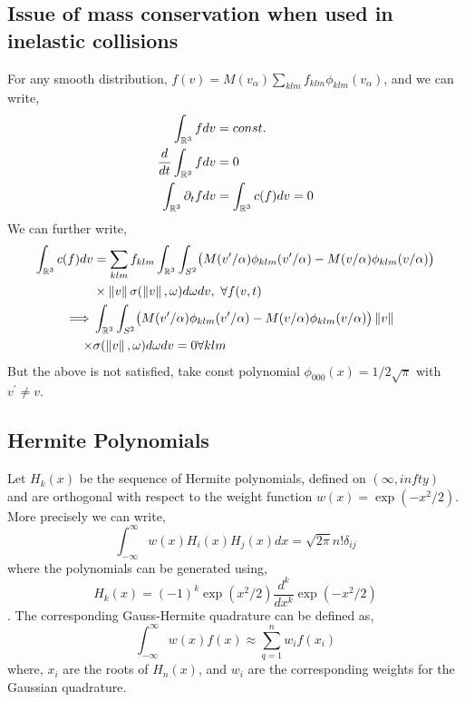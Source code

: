 \documentclass{article}
\begin{document}
\subsection{Issue of mass conservation when used in inelastic collisions}
For any smooth distribution, $f(v) = M(v_\alpha) \sum_{klm} f_{klm} \phi_{klm}(v_\alpha)$, and we can write, 
\begin{align}
\int_{\mathbb{R}^3} f dv &= const.  \\
\frac{d}{dt} \int_{\mathbb{R}^3} f dv &= 0  \\
\int_{\mathbb{R}^3} \partial_t f  dv &= \int_{\mathbb{R}^3} c(f) dv =0 \\
\end{align}
We can further write, 
\begin{align}
\int_{\mathbb{R}^3} c(f) dv  &= \sum_{klm} f_{klm} \int_{\mathbb{R}^3}\int_{S^2} \bigl( M(v^\prime/\alpha) \phi_{klm}(v^\prime/\alpha) -   M(v/\alpha) \phi_{klm}(v/\alpha) \bigr) \\ &\times\left\lVert v\right\rVert \sigma(\left\lVert v\right\rVert,\omega) d\omega dv, \  \forall f(v,t) \\
\implies & \int_{\mathbb{R}^3}\int_{S^2} \bigl( M(v^\prime/\alpha) \phi_{klm}(v^\prime/\alpha) -   M(v/\alpha) \phi_{klm}(v/\alpha) \bigr) \left\lVert v\right\rVert \\ \times &\sigma(\left\lVert v\right\rVert,\omega) d\omega dv =0  \forall klm
\end{align}
But the above is not satisfied, take const polynomial $\phi_{000}(x)=1/2\sqrt{\pi}$ with $v^\prime \neq v$.  



\subsection{Hermite Polynomials}
Let $H_k (x)$ be the sequence of Hermite polynomials, defined on $(\infty,infty)$ and are orthogonal with respect to the weight function $w(x) = \exp(-x^2/2)$. More precisely we can write, 
\begin{equation}
    \int_{-\infty}^{\infty} w(x) H_i(x) H_j(x) dx = \sqrt{2\pi} n! \delta_{ij}
\end{equation}where the polynomials can be generated using, 
\begin{equation}
    H_k(x) = (-1)^k \exp(x^2/2) \frac{d^k}{dx^k} \exp(-x^2/2)
\end{equation}. The corresponding Gauss-Hermite quadrature can be defined as, 
\begin{equation}
    \int_{-\infty}^{\infty} w(x) f(x) \approx \sum_{q=1}^{n} w_i f(x_i)
\end{equation} where, $x_i$ are the roots of $H_n(x)$, and $w_i$ are the corresponding weights for the Gaussian quadrature. 
\end{document}
